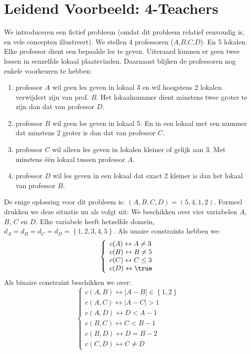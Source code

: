 \section{Leidend Voorbeeld: 4-Teachers}
\begin{leftbar}
We introduceren een fictief probleem (omdat dit probleem relatief eenvoudig is, en vele concepten illustreert). We stellen 4 professoren ($A$,$B$,$C$,$D$). En 5 lokalen. Elke professor dient een bepaalde les te geven. Uiteraard kunnen er geen twee lessen in eenzelfde lokaal plaatsvinden. Daarnaast blijken de professoren nog enkele voorkeuren te hebben:
\begin{enumerate}
 \item professor $A$ wil geen les geven in lokaal 3 en wil hoogstens 2 lokalen verwijdert zijn van prof. $B$. Het lokaalnummer dient minstens twee groter te zijn dan dat van professor $D$.
 \item professor $B$ wil geen les geven in lokaal 5. En in een lokaal met een nummer dat minstens 2 groter is dan dat van professor $C$.
 \item professor $C$ wil alleen les geven in lokalen kleiner of gelijk aan 3. Met minstens \'e\'en lokaal tussen professor $A$.
 \item professor $D$ wil les geven in een lokaal dat exact 2 kleiner is dan het lokaal van professor $B$.
\end{enumerate}
De enige oplossing voor dit probleem is: $\left(A,B,C,D\right)=\left(5,4,1,2\right)$. Formeel drukken we deze situatie nu als volgt uit: We beschikken over vier variabelen $A$, $B$, $C$ en $D$. Elke variabele heeft hetzelfde domein, $d_A=d_B=d_C=d_D=\left\{1,2,3,4,5\right\}$. Als unaire constraints hebben we:
\begin{equation}
\left\{\begin{array}{l}
c(A)\leftrightarrow A\neq 3\\
c(B)\leftrightarrow B\neq 5\\
c(C)\leftrightarrow C\leq 3\\
c(D)\leftrightarrow \true
\end{array}\right.
\end{equation}
Als binaire constraint beschikken we over:
\begin{equation}
\left\{\begin{array}{l}
c(A,B)\leftrightarrow\left|A-B\right|\in\left\{1,2\right\}\\
c(A,C)\leftrightarrow\left|A-C\right|>1\\
c(A,D)\leftrightarrow D<A-1\\
c(B,C)\leftrightarrow C<B-1\\
c(B,D)\leftrightarrow D=B-2\\
c(C,D)\leftrightarrow C\neq D
\end{array}\right.
\end{equation}
\end{leftbar}
